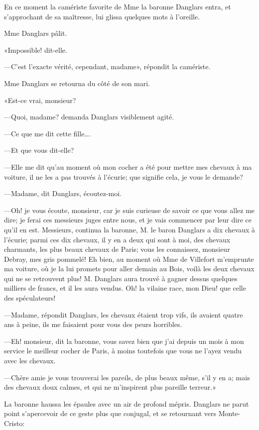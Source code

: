 En ce moment la camériste favorite de Mme la baronne Danglars entra, et s'approchant de sa maîtresse, lui glissa quelques mots à l'oreille. 

Mme Danglars pâlit. 

«Impossible! dit-elle. 

—C'est l'exacte vérité, cependant, madame», répondit la camériste. 

Mme Danglars se retourna du côté de son mari. 

«Est-ce vrai, monsieur? 

—Quoi, madame? demanda Danglars visiblement agité. 

—Ce que me dit cette fille\dots. 

—Et que vous dit-elle? 

—Elle me dit qu'au moment où mon cocher a été pour mettre mes chevaux à ma voiture, il ne les a pas trouvés à l'écurie; que signifie cela, je vous le demande? 

—Madame, dit Danglars, écoutez-moi. 

—Oh! je vous écoute, monsieur, car je suis curieuse de savoir ce que vous allez me dire; je ferai ces messieurs juges entre nous, et je vais commencer par leur dire ce qu'il en est. Messieurs, continua la baronne, M. le baron Danglars a dix chevaux à l'écurie; parmi ces dix chevaux, il y en a deux qui sont à moi, des chevaux charmants, les plus beaux chevaux de Paris; vous les connaissez, monsieur Debray, mes gris pommelé! Eh bien, au moment où Mme de Villefort m'emprunte ma voiture, où je la lui promets pour aller demain au Bois, voilà les deux chevaux qui ne se retrouvent plus! M. Danglars aura trouvé à gagner dessus quelques milliers de francs, et il les aura vendus. Oh! la vilaine race, mon Dieu! que celle des spéculateurs! 

—Madame, répondit Danglars, les chevaux étaient trop vifs, ils avaient quatre ans à peine, ils me faisaient pour vous des peurs horribles. 

—Eh! monsieur, dit la baronne, vous savez bien que j'ai depuis un mois à mon service le meilleur cocher de Paris, à moins toutefois que vous ne l'ayez vendu avec les chevaux. 

—Chère amie je vous trouverai les pareils, de plus beaux même, s'il y en a; mais des chevaux doux calmes, et qui ne m'inspirent plus pareille terreur.» 

La baronne haussa les épaules avec un air de profond mépris. Danglars ne parut point s'apercevoir de ce geste plus que conjugal, et se retournant vers Monte-Cristo: 

